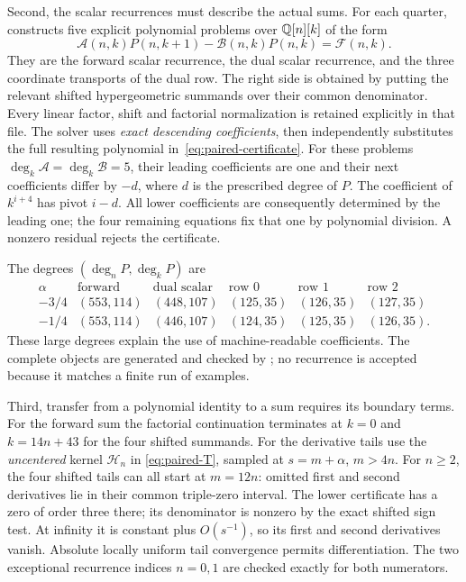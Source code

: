 Second, the scalar recurrences must describe the actual sums.
For each quarter,  constructs five explicit polynomial
problems over $\mathbb Q[n][k]$ of the form
\begin{equation}\label{eq:paired-certificate}
 \mathcal A(n,k)P(n,k+1)-\mathcal B(n,k)P(n,k)
                                             =\mathcal F(n,k).
\end{equation}
They are the forward scalar recurrence, the dual scalar recurrence,
and the three coordinate transports of the dual row. The right side
is obtained by putting the relevant shifted hypergeometric summands
over their common denominator. Every linear factor, shift and factorial
normalization is retained explicitly in that file. The solver uses
\emph{exact descending coefficients}, then independently substitutes
the full resulting polynomial in~\eqref{eq:paired-certificate}.
For these problems $\deg_k\mathcal A=\deg_k\mathcal B=5$, their
leading coefficients are one and their next coefficients differ by
$-d$, where $d$ is the prescribed degree of $P$. The coefficient
of $k^{i+4}$ has pivot $i-d$. All lower coefficients are consequently
determined by the leading one; the four remaining equations fix that
one by polynomial division. A nonzero residual rejects the certificate.

The degrees $(\deg_nP,\deg_kP)$ are
\[
\begin{array}{c|ccccc}
\alpha&\text{forward}&\text{dual scalar}&\text{row }0&\text{row }1&\text{row }2\\\hline
-3/4&(553,114)&(448,107)&(125,35)&(126,35)&(127,35)\\
-1/4&(553,114)&(446,107)&(124,35)&(125,35)&(126,35).
\end{array}
\]
These large degrees explain the use of machine-readable coefficients.
The complete objects are generated and checked by
; no recurrence is accepted because it
matches a finite run of examples.

Third, transfer from a polynomial identity to a sum requires its boundary
terms. For the forward sum the factorial continuation terminates at
$k=0$ and $k=14n+43$ for the four shifted summands. For the derivative
tails use the \emph{uncentered} kernel $\mathcal H_n$ in
\eqref{eq:paired-T}, sampled at $s=m+\alpha$, $m>4n$.
For $n\geq2$, the four shifted tails can all start at $m=12n$:
omitted first and second derivatives lie in their common triple-zero
interval. The lower certificate has a zero of order three there;
its denominator is nonzero by the exact shifted sign test.
At infinity it is constant plus $O(s^{-1})$, so its first and second
derivatives vanish. Absolute locally uniform tail convergence permits
differentiation. The two exceptional recurrence indices $n=0,1$ are
checked exactly for both numerators.


